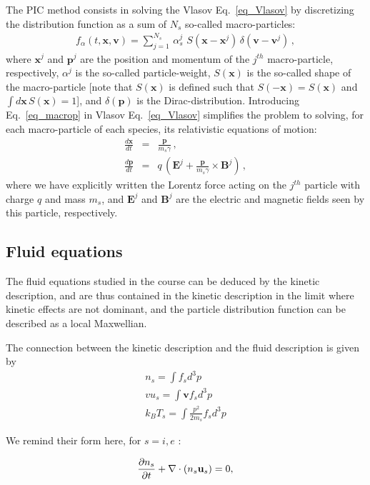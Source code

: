 \documentclass[11pt,a4paper]{article}
\newcommand{\vE}{\mathbf{E}}
\newcommand{\vB}{\mathbf{B}}
\newcommand{\vx}{\mathbf{x}}
\newcommand{\vp}{\mathbf{p}}
\newcommand{\vv}{\mathbf{v}}
\newcommand{\vu}{\mathbf{u}}
\begin{document}
The PIC method consists in solving the Vlasov Eq.~\eqref{eq_Vlasov} by discretizing the distribution function as a sum of $N_s$ so-called macro-particles:
\begin{eqnarray}\label{eq_macrop}
f_\alpha (t,\vx,\vv) = \sum_{j=1}^{N_s}\,\alpha_s^j\,\,S(\vx-\vx^j)\,\delta(\vv-\vv^j)\,,
\end{eqnarray}
where $\vx^j$ and $\vp^j$ are the position and momentum of the $j^{th}$ macro-particle, respectively, $\alpha^j$ is the so-called particle-weight, $S(\vx)$ is the so-called shape of the macro-particle [note that $S(\vx)$ is defined such that $S(-\vx)=S(\vx)$ and $\int d\vx\,S(\vx)=1$], and $\delta(\vp)$ is the Dirac-distribution. Introducing Eq.~\eqref{eq_macrop} in Vlasov Eq.~\eqref{eq_Vlasov} simplifies the problem to solving, for each macro-particle of each species, its relativistic equations of motion:
\begin{subequations}
\begin{eqnarray}
\frac{d\vx}{dt}  &=& \frac{\vp}{m_s \gamma}\,,\\
\frac{d\vp}{dt}  &=&  q\,\left( \vE^j + \frac{\vp}{m_s \gamma} \times \vB^j \right)\,,
\end{eqnarray}
\end{subequations}
where we have explicitly written the Lorentz force acting on the $j^{th}$ particle with charge $q$ and mass $m_s$, and $\vE^j$ and $\vB^j$ are the electric and magnetic fields seen by this particle, respectively.

\subsection*{Fluid equations}

The fluid equations studied in the course can be deduced by the kinetic description, and are thus contained in the kinetic description 
in the limit where kinetic effects are not dominant, and the particle distribution function can be described as a local Maxwellian. 

The connection between the kinetic description and the fluid description is given by 
\begin{eqnarray*}
n_s= \int f_s d^3p \\
vu_s =\int \vv f_s d^3p \\
k_B T_s =\int \frac{p^2}{2m_s}  f_s d^3p
\end{eqnarray*}

We remind their form here, for  $s=i,e$ :

\begin{equation}
\frac{\partial  n_s}{\partial t}+
 {\bf{\nabla}} \cdot (n_s \vu_s) =  0,
\end{equation}
\end{document}
